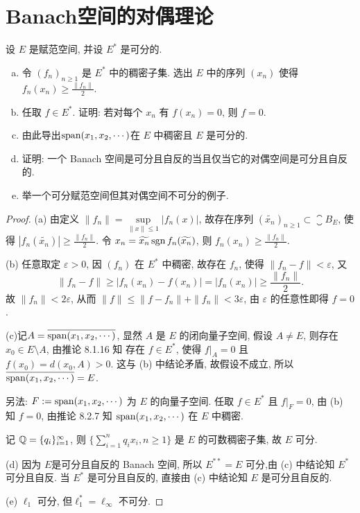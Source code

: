 \chapter{Banach空间的对偶理论}



\begin{exercise}
    设 $E$ 是赋范空间, 并设 $E^*$ 是可分的.
    \begin{enumerate}[(a)]
        \item 令 $(f_n)_{n\geq 1}$ 是 $E^*$ 中的稠密子集. 选出 $E$ 中的序列 $(x_n)$ 使得 $f_n(x_n)\geq\frac{\|f_n\|}{2}$.
        \item 任取 $f\in E^*$. 证明: 若对每个 $x_n$ 有 $f(x_n)=0$, 则 $f=0$.
        \item 由此导出$\operatorname{span}(x_1, x_2, \cdots)$在 $E$ 中稠密且 $E$ 是可分的. 
        \item 证明: 一个 Banach 空间是可分且自反的当且仅当它的对偶空间是可分且自反的. 
        \item 举一个可分赋范空间但其对偶空间不可分的例子.
    \end{enumerate}
\end{exercise}

\begin{proof}
    (a) 由定义 $\|f_n\|=\sup\limits_{\|x\|\leq 1}|f_n(x)|$, 
    故存在序列 $(\widetilde{x_n})_{n\geq 1}\subset\closure{B_E}$, 
    使得 $|f_n(\widetilde{x_n})|\geq\frac{\|f_n\|}{2}$.
    令 $x_n=\widetilde{x_n}\operatorname{sgn} f_n(\widetilde{x_n})$, 则 $f_n(x_n)\geq\frac{\|f_n\|}{2}$.

    (b) 任意取定 $\varepsilon>0$, 因 $(f_n)$ 在 $E^*$ 中稠密, 
    故存在 $f_n$, 使得 $\|f_n-f\|<\varepsilon$, 又
    \[\|f_n-f\|\geq |f_n(x_n)-f(x_n)|=|f_n(x_n)|\geq\frac{\|f_n\|}{2}.\]
    故 $\|f_n\|<2\varepsilon$, 从而 $\|f\|\leq\|f-f_n\|+\|f_n\|<3\varepsilon$,
    由 $\varepsilon$ 的任意性即得 $f=0$.

    (c)记$A=\overline{\operatorname{span}(x_1,x_2,\cdots)}$, 显然 $A$ 是 $E$ 的闭向量子空间,
    假设 $A\neq E$, 则存在 $x_0\in E\setminus A$, 由推论 8.1.16 知
    存在 $f\in E^*$, 使得 $f|_A=0$ 且 $f(x_0)=d(x_0,A)>0$.
    这与 (b) 中结论矛盾, 故假设不成立, 所以 $\overline{\operatorname{span}(x_1,x_2,\cdots)}=E$.

    另法: $F:=\operatorname{span}(x_1,x_2,\cdots)$ 为 $E$ 的向量子空间. 任取 $f\in E^*$ 且 $f|_F=0$,
    由 (b) 知 $f=0$, 由推论 8.2.7 知 $\operatorname{span}(x_1,x_2,\cdots)$ 在 $E$ 中稠密.

    记 $\mathbb{Q}=\{q_i\}_{i=1}^{\infty}$, 
    则 $\{\sum_{i=1}^nq_ix_i,n\geq 1\}$ 是 $E$ 的可数稠密子集, 故 $E$ 可分.

    (d) \necessary
    因为 $E$是可分且自反的 Banach 空间, 所以 $E^{**}=E$ 可分,由 (c) 中结论知 $E^*$ 可分且自反.
    \sufficient
    当 $E^*$ 是可分且自反的, 直接由 (c) 中结论知 $E$ 是可分且自反的.

    (e) $\ell_1$ 可分, 但$\ell_1^*=\ell_{\infty}$ 不可分.
\end{proof}



